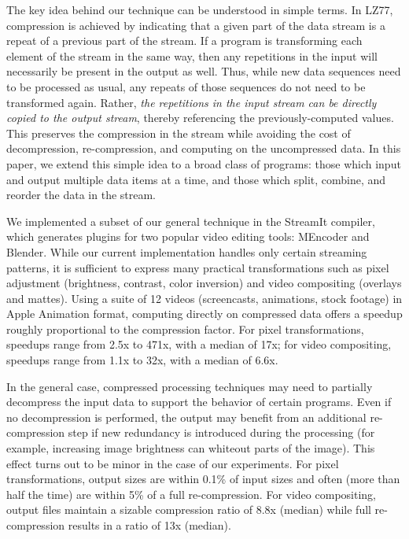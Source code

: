The key idea behind our technique can be understood in simple terms.
In LZ77, compression is achieved by indicating that a given part of
the data stream is a repeat of a previous part of the stream.  If a
program is transforming each element of the stream in the same way,
then any repetitions in the input will necessarily be present in the
output as well.  Thus, while new data sequences need to be processed
as usual, any repeats of those sequences do not need to be transformed
again.  Rather, {\it the repetitions in the input stream can be
  directly copied to the output stream}, thereby referencing the
previously-computed values.  This preserves the compression in the
stream while avoiding the cost of decompression, re-compression, and
computing on the uncompressed data.  In this paper, we extend this
simple idea to a broad class of programs: those which input and
output multiple data items at a time, and those which split, combine,
and reorder the data in the stream.

We implemented a subset of our general technique in the StreamIt
compiler, which generates plugins for two popular video editing tools:
MEncoder and Blender.  While our current implementation handles only
certain streaming patterns, it is sufficient to express many practical
transformations such as pixel adjustment (brightness, contrast, color
inversion) and video compositing (overlays and mattes).  Using a suite
of 12 videos (screencasts, animations, stock footage) in Apple
Animation format, computing directly on compressed data offers a
speedup roughly proportional to the compression factor.  For pixel
transformations, speedups range from 2.5x to 471x, with a median of
17x; for video compositing, speedups range from 1.1x to 32x, with a
median of 6.6x.

In the general case, compressed processing techniques may need to
partially decompress the input data to support the behavior of certain
programs.  Even if no decompression is performed, the output may
benefit from an additional re-compression step if new redundancy is
introduced during the processing (for example, increasing image
brightness can whiteout parts of the image).  This effect turns out to
be minor in the case of our experiments.  For pixel transformations,
output sizes are within 0.1\% of input sizes and often (more than half
the time) are within 5\% of a full re-compression.  For video
compositing, output files maintain a sizable compression ratio of 8.8x
(median) while full re-compression results in a ratio of 13x (median).

